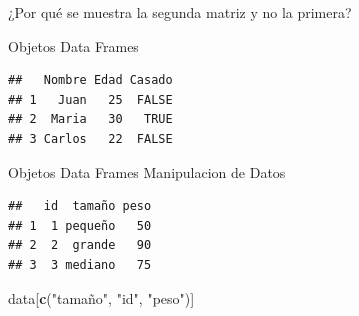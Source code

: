 \documentclass[
  ignorenonframetext,
]{beamer}
\newenvironment{Shaded}{\begin{snugshade}}{\end{snugshade}}
\newcommand{\AttributeTok}[1]{\textcolor[rgb]{0.13,0.29,0.53}{#1}}
\newcommand{\CommentTok}[1]{\textcolor[rgb]{0.56,0.35,0.01}{\textit{#1}}}
\newcommand{\ConstantTok}[1]{\textcolor[rgb]{0.56,0.35,0.01}{#1}}
\newcommand{\DecValTok}[1]{\textcolor[rgb]{0.00,0.00,0.81}{#1}}
\newcommand{\DocumentationTok}[1]{\textcolor[rgb]{0.56,0.35,0.01}{\textbf{\textit{#1}}}}
\newcommand{\FunctionTok}[1]{\textcolor[rgb]{0.13,0.29,0.53}{\textbf{#1}}}
\newcommand{\NormalTok}[1]{#1}
\newcommand{\OtherTok}[1]{\textcolor[rgb]{0.56,0.35,0.01}{#1}}
\newcommand{\SpecialCharTok}[1]{\textcolor[rgb]{0.81,0.36,0.00}{\textbf{#1}}}
\newcommand{\StringTok}[1]{\textcolor[rgb]{0.31,0.60,0.02}{#1}}
\begin{document}
\begin{frame}[fragile]{¿Por qué se muestra la segunda matriz y no la
primera?}
\begin{block}{Objetos \textbar{} Data Frames}
\begin{verbatim}
##   Nombre Edad Casado
## 1   Juan   25  FALSE
## 2  Maria   30   TRUE
## 3 Carlos   22  FALSE
\end{verbatim}
\end{block}

\begin{block}{Objetos \textbar{} Data Frames}
\protect\hypertarget{objetos-data-frames-1}{}
Manipulacion de Datos

\begin{Shaded}
\end{Shaded}

\begin{verbatim}
##   id  tamaño peso
## 1  1 pequeño   50
## 2  2  grande   90
## 3  3 mediano   75
\end{verbatim}

\begin{Shaded}
\begin{Highlighting}[]
\NormalTok{data[}\FunctionTok{c}\NormalTok{(}\StringTok{"tamaño"}\NormalTok{, }\StringTok{"id"}\NormalTok{, }\StringTok{"peso"}\NormalTok{)]}
\end{Highlighting}
\end{Shaded}


\end{block}
\end{frame}
\end{document}
